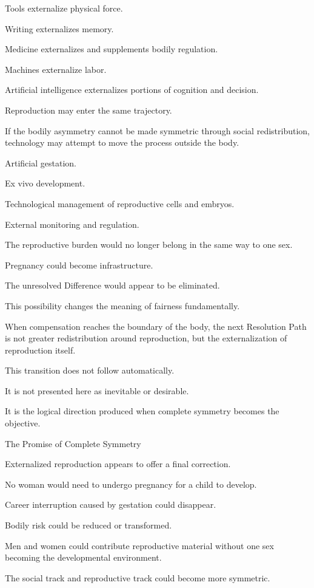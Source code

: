 Tools externalize physical force.

Writing externalizes memory.

Medicine externalizes and supplements bodily regulation.

Machines externalize labor.

Artificial intelligence externalizes portions of cognition and decision.

Reproduction may enter the same trajectory.

If the bodily asymmetry cannot be made symmetric through social redistribution, technology may attempt to move the process outside the body.

Artificial gestation.

Ex vivo development.

Technological management of reproductive cells and embryos.

External monitoring and regulation.

The reproductive burden would no longer belong in the same way to one sex.

Pregnancy could become infrastructure.

The unresolved Difference would appear to be eliminated.

This possibility changes the meaning of fairness fundamentally.

When compensation reaches the boundary of the body, the next Resolution Path is not greater redistribution around reproduction, but the externalization of reproduction itself.

This transition does not follow automatically.

It is not presented here as inevitable or desirable.

It is the logical direction produced when complete symmetry becomes the objective.

The Promise of Complete Symmetry

Externalized reproduction appears to offer a final correction.

No woman would need to undergo pregnancy for a child to develop.

Career interruption caused by gestation could disappear.

Bodily risk could be reduced or transformed.

Men and women could contribute reproductive material without one sex becoming the developmental environment.

The social track and reproductive track could become more symmetric.

